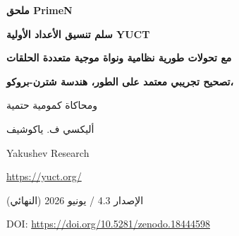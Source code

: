 \documentclass[11pt,a4paper]{article}
\newcommand{\kappac}{\kappa_c}
\newcommand{\Seven}{S_{\mathrm{even}}}
\begin{document}
	
	\begin{titlepage}
		\centering
		\vspace*{0cm}
		
		{\Huge\bfseries ملحق PrimeN\par}
		\vspace{0.5cm}
		{\Large\bfseries سلم تنسيق الأعداد الأولية YUCT\par}
		\vspace{0.3cm}
		{\Large\bfseries مع تحولات طورية نظامية ونواة موجية متعددة الحلقات\par}
		\vspace{0.3cm}
		{\Large\bfseries تصحيح تجريبي معتمد على الطور، هندسة شترن-بروكو،\par
			ومحاكاة كمومية حتمية\par}
		\vspace{1.0cm}
		
		{\large أليكسي ف. ياكوشيف\par}
		\vspace{0.3cm}
		{\normalsize Yakushev Research\par}
		{\normalsize \url{https://yuct.org/}\par}
		
		\vspace{0.5cm}
		{\normalsize الإصدار 4.3 / يونيو 2026 (النهائي)\par}
		\vspace{0.3cm}
		{\normalsize DOI: \url{https://doi.org/10.5281/zenodo.18444598}\par}
		
		\vfill
		
		\begin{abstract}
			\noindent
			نؤسس ارتباطًا صارمًا بين توزيع الأعداد الأولية ونظرية التنسيق الموحدة ياكوشيف (YUCT). يتحكم قانون الخطأ العام \(\varepsilon = \kappac \alpha K_{\mathrm{eff}}^{-\beta}\) (\(\beta=2/3\), \(\kappac=1/3\)) في التقلبات المقاربة للعدد الأولي \(p_n\) حول تقريب روسر الكلاسيكي. من الحلقة الجبرية لـ YUCT نشتق \textbf{تصحيحًا نظريًا} \(p_n \approx R_n - \frac{\Seven}{2}\, n^{1-\beta}\,\ln n\)، والذي \textbf{لا يحتوي على معاملات حرة} ويقدم وصفًا مقاربًا دقيقًا للاتجاه السلس لانحرافات الأعداد الأولية (النظرية~4).
			
			\textbf{الجديد في هذا الإصدار:} نكتشف ونشتق رياضيًا \textbf{تحولات طورية متتالية} لشبكة الفراغ، والتي تظهر كقلبات إشارة تصحيح الحلقة الأولى عند المؤشرات الحرجة \(N_f = 80,\,96.5,\,113,\,\dots\) بخطوة \(\Delta N = 16.5\)، المستمدة مباشرة من عدد فرميونات فايل \(L_0 = 96\) والثابت القطاعي الزوجي \(\Seven = 0.8\). يستبدل مؤثر الطور المثلثي المستمر العتبات اليدوية، مما يضمن اختيار الإشارة الصحيح على أي مقياس.
			

\end{abstract}
\end{titlepage}
\end{document}

